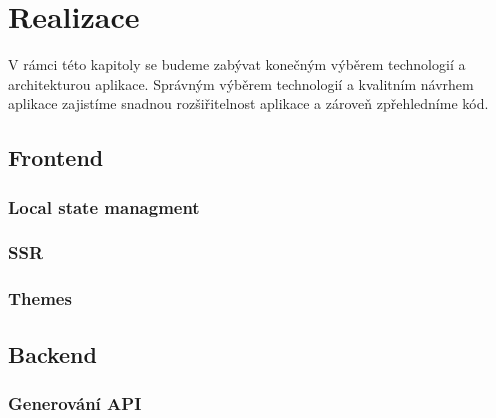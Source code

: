 \chapter{Realizace}
\label{ch:implementation}
V rámci této kapitoly se budeme zabývat konečným výběrem technologií a architekturou aplikace. Správným výběrem technologií a kvalitním návrhem aplikace zajistíme snadnou rozšiřitelnost aplikace a zároveň zpřehledníme kód.







\section{Frontend}
\label{sc:frontend}

\subsection{Local state managment}
\label{ss:local_state_management}

\subsection{SSR}
\label{ss:ssr}

\subsection{Themes}
\label{ss:themes}

\section{Backend}
\label{sc:backend}

\subsection{Generování API}
\label{ss:api_generating}


